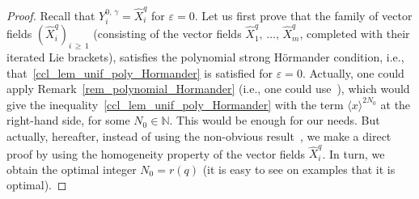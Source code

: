 \documentclass[10pt]{amsart}
\theoremstyle{definition}\newtheorem{defi}[theo]{Definition}\newtheorem{rema}[theo]{Remark}\newtheorem{exam}[theo]{Example}\newtheorem{exem}[theo]{Example}\newtheorem{nota}[theo]{Notation}
\newcommand*\N{\mathbb{N}}
\renewcommand{\geq}{\geqslant}
\begin{document}
\begin{proof}
Recall that $Y_i^{0,\,\gamma}= \widehat{X}_i^{q}$ for $\varepsilon=0$. Let us first prove that the family of vector fields $(\widehat{X}_i^{q})_{i\,\geq\,1}$ (consisting of the vector fields $\widehat{X}_1^{q},\,\ldots,\,\widehat{X}_m^{q}$, completed with their iterated Lie brackets), satisfies the polynomial strong H\"ormander condition, i.e., that~\eqref{ccl_lem_unif_poly_Hormander} is satisfied for $\varepsilon=0$. Actually, one could apply Remark~\ref{rem_polynomial_Hormander} (i.e., one could use~\cite[Lemma~2]{Ho-58}), which would give the inequality~\eqref{ccl_lem_unif_poly_Hormander} with the term $\langle x\rangle^{2N_0}$ at the right-hand side, for some $N_0\in\N$. This would be enough for our needs. But actually, hereafter, instead of using the non-obvious result~\cite[Lemma~2]{Ho-58}, we make a direct proof by using the homogeneity property of the vector fields $\widehat{X}_i^{q}$. In turn, we obtain the optimal integer $N_0=r(q)$ (it is easy to see on examples that it is optimal).


\end{proof}
\end{document}
